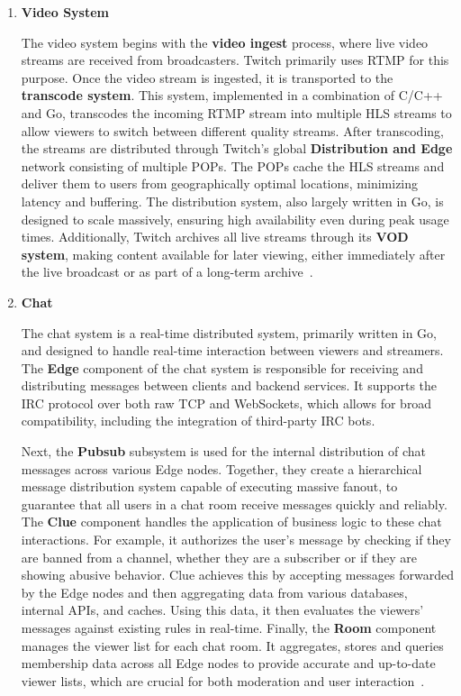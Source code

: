 \begin{enumerate}
    \item \textbf{Video System}
    
    The video system begins with the \textbf{video ingest} process, where live video streams are received from broadcasters. Twitch primarily uses \ac{RTMP} for this purpose. Once the video stream is ingested, it is transported to the \textbf{transcode system}. This system, implemented in a combination of C/C++ and Go, transcodes the incoming \ac{RTMP} stream into multiple \ac{HLS} streams to allow viewers to switch between different quality streams.
    After transcoding, the streams are distributed through Twitch's global \textbf{Distribution and Edge} network consisting of multiple \ac{POPs}. The \ac{POPs} cache the \ac{HLS} streams and deliver them to users from geographically optimal locations, minimizing latency and buffering. The distribution system, also largely written in Go, is designed to scale massively, ensuring high availability even during peak usage times. Additionally, Twitch archives all live streams through its \textbf{\ac{VOD} system}, making content available for later viewing, either immediately after the live broadcast or as part of a long-term archive~\parencite{twitch_engineering}.
    
    \item \textbf{Chat}

    The chat system is a real-time distributed system, primarily written in Go, and designed to handle real-time interaction between viewers and streamers. The \textbf{Edge} component of the chat system is responsible for receiving and distributing messages between clients and backend services. It supports the \ac{IRC} protocol over both raw TCP and WebSockets, which allows for broad compatibility, including the integration of third-party \ac{IRC} bots.
    
    Next, the \textbf{Pubsub} subsystem is used for the internal distribution of chat messages across various Edge nodes. Together, they create a hierarchical message distribution system capable of executing massive fanout, to guarantee that all users in a chat room receive messages quickly and reliably. The \textbf{Clue} component handles the application of business logic to these chat interactions. For example, it authorizes the user's message by checking if they are banned from a channel, whether they are a subscriber or if they are showing abusive behavior. Clue achieves this by accepting messages forwarded by the Edge nodes and then aggregating data from various databases, internal \ac{API}s, and caches. Using this data, it then evaluates the viewers' messages against existing rules in real-time. Finally, the \textbf{Room} component manages the viewer list for each chat room. It aggregates, stores and queries membership data across all Edge nodes to provide accurate and up-to-date viewer lists, which are crucial for both moderation and user interaction~\parencite{twitch_chat}.


\end{enumerate}
